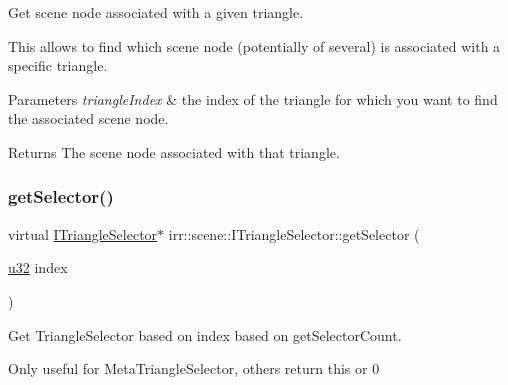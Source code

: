 Get scene node associated with a given triangle. 

This allows to find which scene node (potentially of several) is associated with a specific triangle.


\begin{DoxyParams}{Parameters}
{\em triangle\+Index} & the index of the triangle for which you want to find the associated scene node. \\
\hline
\end{DoxyParams}
\begin{DoxyReturn}{Returns}
The scene node associated with that triangle. 
\end{DoxyReturn}
\mbox{\label{classirr_1_1scene_1_1ITriangleSelector_a51e15d33c41642441a311a33d2f1ebed}} 
\subsubsection{\texorpdfstring{get\+Selector()}{getSelector()}\hspace{0.1cm}{\footnotesize\ttfamily [1/2]}}
{\footnotesize\ttfamily virtual \hyperlink{classirr_1_1scene_1_1ITriangleSelector}{I\+Triangle\+Selector}$\ast$ irr\+::scene\+::\+I\+Triangle\+Selector\+::get\+Selector (\begin{DoxyParamCaption}\item[{\hyperlink{namespaceirr_a0416a53257075833e7002efd0a18e804}{u32}}]{index }\end{DoxyParamCaption})\hspace{0.3cm}{\ttfamily [pure virtual]}}



Get Triangle\+Selector based on index based on get\+Selector\+Count. 

Only useful for Meta\+Triangle\+Selector, others return \textquotesingle{}this\textquotesingle{} or 0 \mbox{\label{classirr_1_1scene_1_1ITriangleSelector_ad5d221ea393e67872c902d35e77fa69e}} 
